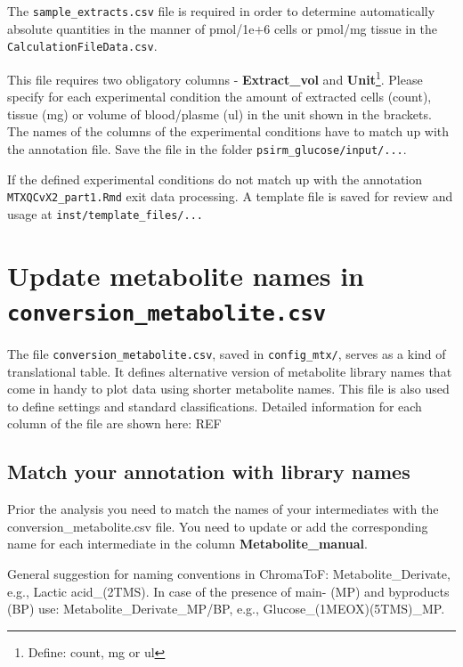 \documentclass[]{book}
\let\rmarkdownfootnote\footnote%
\def\footnote{\protect\rmarkdownfootnote}
\theoremstyle{definition}
\theoremstyle{definition}
\theoremstyle{definition}
\theoremstyle{remark}
\begin{document}
The \texttt{sample\_extracts.csv} file is required in order to determine
automatically absolute quantities in the manner of pmol/1e+6 cells or
pmol/mg tissue in the \texttt{CalculationFileData.csv}.

This file requires two obligatory columns - \textbf{Extract\_vol} and
\textbf{Unit}\footnote{Define: count, mg or ul}. Please specify for each
experimental condition the amount of extracted cells (count), tissue
(mg) or volume of blood/plasme (ul) in the unit shown in the brackets.\\
The names of the columns of the experimental conditions have to match up
with the annotation file. Save the file in the folder
\texttt{psirm\_glucose/input/...}.

If the defined experimental conditions do not match up with the
annotation \texttt{MTXQCvX2\_part1.Rmd} exit data processing. A template
file is saved for review and usage at \texttt{inst/template\_files/...}

\section{\texorpdfstring{Update metabolite names in
\texttt{conversion\_metabolite.csv}}{Update metabolite names in conversion\_metabolite.csv}}\label{update-metabolite-names-in-conversion_metabolite.csv}

The file \texttt{conversion\_metabolite.csv}, saved in
\texttt{config\_mtx/}, serves as a kind of translational table. It
defines alternative version of metabolite library names that come in
handy to plot data using shorter metabolite names. This file is also
used to define settings and standard classifications. Detailed
information for each column of the file are shown here: REF

\subsection{Match your annotation with library
names}\label{match-your-annotation-with-library-names}

Prior the analysis you need to match the names of your intermediates
with the conversion\_metabolite.csv file. You need to update or add the
corresponding name for each intermediate in the column
\textbf{Metabolite\_manual}.

General suggestion for naming conventions in ChromaToF:
Metabolite\_Derivate, e.g., Lactic acid\_(2TMS). In case of the presence
of main- (MP) and byproducts (BP) use: Metabolite\_Derivate\_MP/BP,
e.g., Glucose\_(1MEOX)(5TMS)\_MP.
\end{document}
